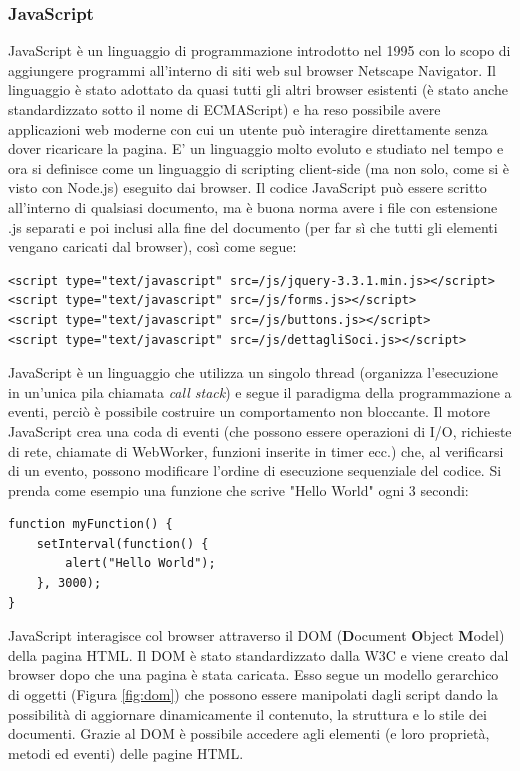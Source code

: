 \documentclass[12pt]{report}
\begin{document}
\subsubsection*{JavaScript}
%
JavaScript è un linguaggio di programmazione introdotto nel 1995 con lo scopo di aggiungere programmi all'interno di siti web sul browser Netscape Navigator. Il linguaggio è stato adottato da quasi tutti gli altri browser esistenti (è stato anche standardizzato sotto il nome di ECMAScript) e ha reso possibile avere applicazioni web moderne con cui un utente può interagire direttamente senza dover ricaricare la pagina\cite{eloquent_javascript}. E' un linguaggio molto evoluto e studiato nel tempo e ora si definisce come un linguaggio di scripting client-side (ma non solo, come si è visto con Node.js) eseguito dai browser. Il codice JavaScript può essere scritto all'interno di qualsiasi documento, ma è buona norma avere i file con estensione .js separati e poi inclusi alla fine del documento (per far sì che tutti gli elementi vengano caricati dal browser), così come segue: 
\begin{lstlisting}
<script type="text/javascript" src=/js/jquery-3.3.1.min.js></script>
<script type="text/javascript" src=/js/forms.js></script>
<script type="text/javascript" src=/js/buttons.js></script>
<script type="text/javascript" src=/js/dettagliSoci.js></script>
\end{lstlisting}
JavaScript è un linguaggio che utilizza un singolo thread (organizza l'esecuzione in un'unica pila chiamata \emph{call stack}) e segue il paradigma della programmazione a eventi, perciò è possibile costruire un comportamento non bloccante. Il motore JavaScript crea una coda di eventi (che possono essere operazioni di I/O, richieste di rete, chiamate di WebWorker, funzioni inserite in timer ecc.) che, al verificarsi di un evento, possono modificare l'ordine di esecuzione sequenziale del codice. Si prenda come esempio una funzione che scrive "Hello World" ogni 3 secondi: 
\begin{lstlisting}
function myFunction() {
	setInterval(function() { 
		alert("Hello World"); 
	}, 3000);
}
\end{lstlisting}
JavaScript interagisce col browser attraverso il DOM (\textbf{D}ocument \textbf{O}bject \textbf{M}odel) della pagina HTML. Il DOM è stato standardizzato dalla W3C e viene creato dal browser dopo che una pagina è stata caricata. Esso segue un modello gerarchico di oggetti (Figura \ref{fig:dom}) che possono essere manipolati dagli script dando la possibilità di aggiornare dinamicamente il contenuto, la struttura e lo stile dei documenti. Grazie al DOM è possibile accedere agli elementi (e loro proprietà, metodi ed eventi) delle pagine HTML.
\end{document}
